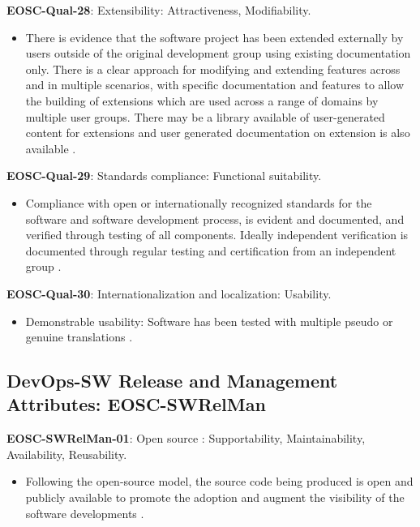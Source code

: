 \textbf{EOSC-Qual-28}: Extensibility: Attractiveness, Modifiability.

\begin{itemize}
    \item There is evidence that the software project has been extended externally by users outside of the original development group using existing documentation only. There is a clear approach for modifying and extending features across and in multiple scenarios, with specific documentation and features to allow the building of extensions which are used across a range of domains by multiple user groups. There may be a library available of user-generated content for extensions and user generated documentation on extension is also available \cite{shepherdson_cessda_2019}.
\end{itemize}

\textbf{EOSC-Qual-29}: Standards compliance: Functional suitability.

\begin{itemize}
    \item Compliance with open or internationally recognized standards for the software and software development process, is evident and documented, and verified through testing of all components. Ideally independent verification is documented through regular testing and certification from an independent group \cite{shepherdson_cessda_2019}.
\end{itemize}

\textbf{EOSC-Qual-30}: Internationalization and localization: Usability.

\begin{itemize}
    \item Demonstrable usability: Software has been tested with multiple pseudo or genuine translations \cite{shepherdson_cessda_2019}.
\end{itemize}

\subsection{DevOps-SW Release and Management Attributes: EOSC-SWRelMan}

\textbf{EOSC-SWRelMan-01}: Open source : Supportability, Maintainability, Availability, Reusability.

\begin{itemize}
    \item Following the open-source model, the source code being produced is open and publicly available to promote the adoption and augment the visibility of the software developments \cite{orviz_set_2017,raymond_software_2013}.
\end{itemize}

